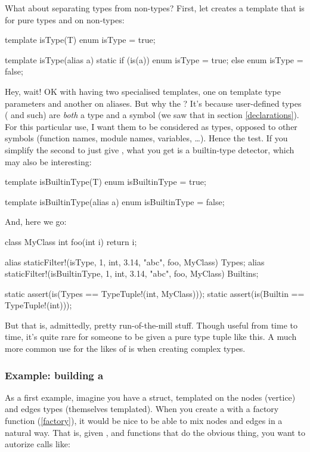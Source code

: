 What about separating types from non-types? First, let creates a template that is  for pure types and  on non-types:

\begin{dcode}
template isType(T)
{
    enum isType = true;
}

template isType(alias a)
{
    static if (is(a))
        enum isType = true;
    else
        enum isType = false;
}
\end{dcode}

Hey, wait! OK with having two specialised templates, one on template type parameters and another on aliases. But why the ? It's because user-defined types ( and such) are \emph{both} a type and a symbol (we saw that in section \ref{declarations}). For this particular use, I want them to be considered as types, opposed to other symbols (function names, module names, variables, \ldots). Hence the \DD{()} test. If you simplify the second  to just give , what you get is a builtin-type detector, which may also be interesting:

\begin{dcode}
template isBuiltinType(T)
{
    enum isBuiltinType = true;
}

template isBuiltinType(alias a)
{
    enum isBuiltinType = false;
}
\end{dcode}

And, here we go:

\begin{dcode}
class MyClass {}
int foo(int i) { return i;}

alias staticFilter!(isType, 1, int, 3.14, "abc", foo, MyClass) Types;
alias staticFilter!(isBuiltinType, 1, int, 3.14, "abc", foo, MyClass) Builtins;

static assert(is(Types == TypeTuple!(int, MyClass)));
static assert(is(Builtin == TypeTuple!(int)));
\end{dcode}

But that is, admittedly, pretty run-of-the-mill stuff. Though useful from time to time, it's quite rare for someone to be given a pure type tuple like this. A much more common use for the likes of  is when creating complex types.

\subsubsection{Example: building a }

As a first example, imagine you have a  struct, templated on the nodes (vertice) and edges types (themselves templated). When you create a  with a factory function (\ref{factory}), it would be nice to be able to mix nodes and edges in a natural way. That is, given ,  and  functions that do the obvious thing, you want to autorize calls like:

